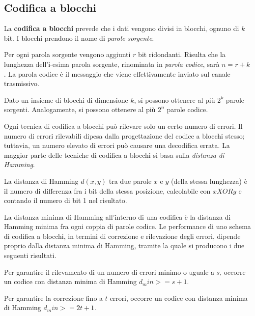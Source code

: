     \subsection{Codifica a blocchi}
        
        La \textbf{codifica a blocchi} prevede che i dati vengono divisi in blocchi, ognuno di $k$ bit. I blocchi prendono il nome di \textit{parole sorgente}.
        
        Per ogni parola sorgente vengono aggiunti $r$ bit ridondanti. Risulta che la lunghezza dell'i-esima parola sorgente, rinominata in \textit{parola codice}, sarà $n=r+k$. La parola codice è il messaggio che viene effettivamente inviato sul canale trasmissivo.
        
        Dato un insieme di blocchi di dimensione $k$, si possono ottenere al più $2^k$ parole sorgenti. Analogamente, si possono ottenere al più $2^n$ parole codice.
        
        \vspace{3mm}
        
        Ogni tecnica di codifica a blocchi può rilevare solo un certo numero di errori. Il numero di errori rilevabili dipesa dalla progettazione del codice a blocchi stesso; tuttavia, un numero elevato di errori può causare una decodifica errata. La maggior parte delle tecniche di codifica a blocchi si basa sulla \textit{distanza di Hamming}.
        
        \vspace{3mm}
        
        La distanza di Hamming $d(x,y)$ tra due parole $x$ e $y$ (della stessa lunghezza) è il numero di differenza fra i bit della stessa posizione, calcolabile con $x XOR y$ e contando il numero di bit 1 nel risultato.
        
        La distanza minima di Hamming all'interno di una codifica è la distanza di Hamming minima fra ogni coppia di parole codice. Le performance di uno schema di codifica a blocchi, in termini di correzione e rilevazione degli errori, dipende proprio dalla distanza minima di Hamming, tramite la quale si producono i due seguenti risultati.
        
        \vspace{3mm}
        
        Per garantire il rilevamento di un numero di errori minimo o uguale a $s$, occorre un codice con distanza minima di Hamming $d_min >= s+1$.
        
        Per garantire la correzione fino a $t$ errori, occorre un codice con distanza minima di Hamming $d_min >= 2t+1$.
        
